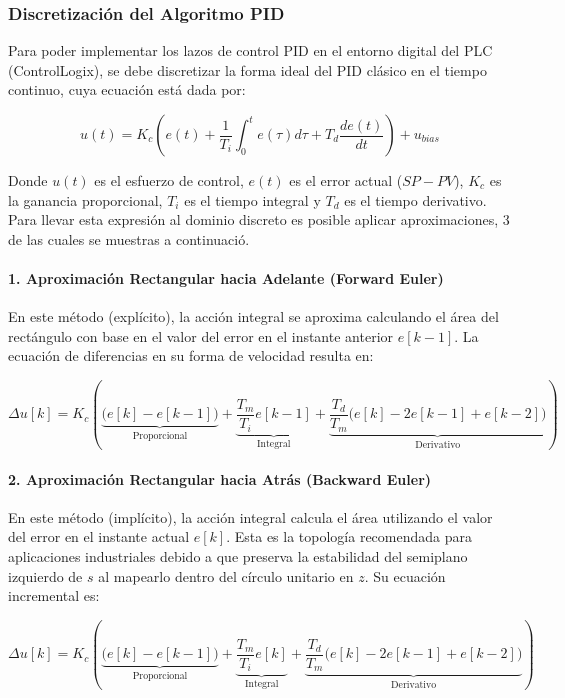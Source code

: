 \subsubsection{Discretización del Algoritmo PID}
Para poder implementar los lazos de control PID en el entorno digital del PLC (ControlLogix), se debe discretizar la forma ideal del PID clásico en el tiempo continuo, cuya ecuación está dada por:

\begin{equation}
  \label{eq:pid_continuo}
  u(t) = K_c \left( e(t) + \frac{1}{T_i} \int_{0}^{t} e(\tau) d\tau + T_d \frac{de(t)}{dt} \right) + u_{bias}
\end{equation}

Donde $u(t)$ es el esfuerzo de control, $e(t)$ es el error actual ($SP - PV$), $K_c$ es la ganancia proporcional, $T_i$ es el tiempo integral y $T_d$ es el tiempo derivativo. 
Para llevar esta expresión al dominio discreto es posible aplicar aproximaciones, 3 de las cuales se muestras a continuació.

\paragraph{1. Aproximación Rectangular hacia Adelante (Forward Euler)}
En este método (explícito), la acción integral se aproxima calculando el área del rectángulo con base en el valor del error en el instante anterior $e[k-1]$. La ecuación de diferencias en su forma de velocidad resulta en:

\begin{equation}
  \label{eq:euler_adelante}
  \Delta u[k] = K_c \left( \underbrace{\big(e[k] - e[k-1]\big)}_{\text{Proporcional}} + \underbrace{\frac{T_m}{T_i} e[k-1]}_{\text{Integral}} + \underbrace{\frac{T_d}{T_m} \big(e[k] - 2e[k-1] + e[k-2]\big)}_{\text{Derivativo}} \right)
\end{equation}

\paragraph{2. Aproximación Rectangular hacia Atrás (Backward Euler)}
En este método (implícito), la acción integral calcula el área utilizando el valor del error en el instante actual $e[k]$. Esta es la topología recomendada para aplicaciones industriales debido a que preserva la estabilidad del semiplano izquierdo de $s$ al mapearlo dentro del círculo unitario en $z$. Su ecuación incremental es:

\begin{equation}
  \label{eq:euler_atras}
  \Delta u[k] = K_c \left( \underbrace{\big(e[k] - e[k-1]\big)}_{\text{Proporcional}} + \underbrace{\frac{T_m}{T_i} e[k]}_{\text{Integral}} + \underbrace{\frac{T_d}{T_m} \big(e[k] - 2e[k-1] + e[k-2]\big)}_{\text{Derivativo}} \right)
\end{equation}
